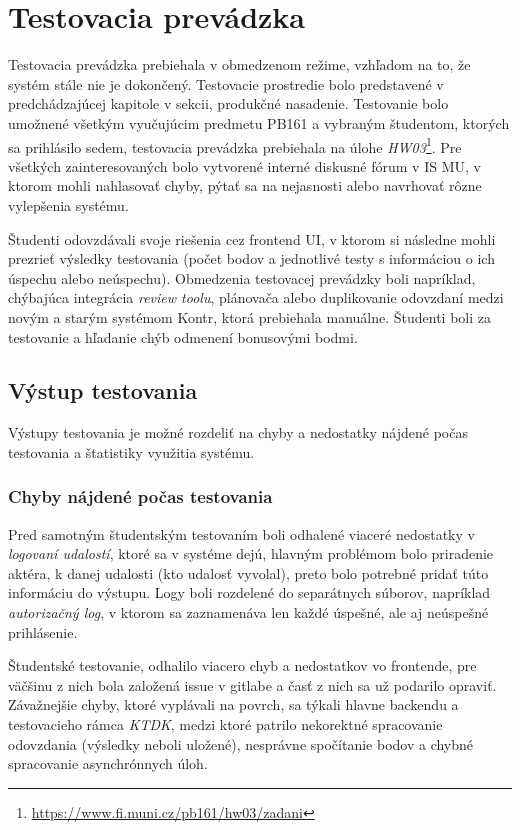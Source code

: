 \documentclass[
  digital, %
  twoside, %
  table,   %
  lof,     %
  lot,     %
]{fithesis3}
\begin{document}
\chapter{Testovacia prevádzka}

Testovacia prevádzka prebiehala v obmedzenom režime, vzhľadom na to, že systém stále nie je dokončený. Testovacie prostredie bolo predstavené v predchádzajúcej kapitole v sekcii, produkčné nasadenie. Testovanie bolo umožnené všetkým vyučujúcim predmetu PB161 a vybraným študentom, ktorých sa prihlásilo sedem, testovacia prevádzka prebiehala na úlohe \emph{HW03}\footnote{\url{https://www.fi.muni.cz/pb161/hw03/zadani}}. Pre všetkých zainteresovaných bolo vytvorené interné diskusné fórum v IS MU, v ktorom mohli nahlasovať chyby, pýtať sa na nejasnosti alebo navrhovať rôzne vylepšenia systému.

Študenti odovzdávali svoje riešenia cez frontend UI, v ktorom si následne mohli prezrieť výsledky testovania (počet bodov a jednotlivé testy s informáciou o ich úspechu alebo neúspechu). Obmedzenia testovacej prevádzky boli napríklad, chýbajúca integrácia \emph{review toolu}, plánovača alebo duplikovanie odovzdaní medzi novým a starým systémom Kontr, ktorá prebiehala manuálne. Študenti boli za testovanie a hľadanie chýb odmenení bonusovými bodmi.

\section{Výstup testovania}
Výstupy testovania je možné rozdeliť na chyby a nedostatky nájdené počas testovania a štatistiky využitia systému.

\subsection{Chyby nájdené počas testovania}

Pred samotným študentským testovaním boli odhalené viaceré nedostatky v \emph{logovaní udalostí}, ktoré sa v systéme dejú, hlavným problémom bolo priradenie aktéra, k danej udalosti (kto udalosť vyvolal), preto bolo potrebné pridať túto informáciu do výstupu. Logy boli rozdelené do separátnych súborov, napríklad \emph{autorizačný log}, v ktorom sa zaznamenáva len každé úspešné, ale aj neúspešné prihlásenie.

Študentské testovanie, odhalilo viacero chyb a nedostatkov vo frontende, pre väčšinu z nich bola založená issue v gitlabe a časť z nich sa už podarilo opraviť.
Závažnejšie chyby, ktoré vyplávali na povrch, sa týkali hlavne backendu a testovacieho rámca \emph{KTDK}, medzi ktoré patrilo nekorektné spracovanie odovzdania (výsledky neboli uložené), nesprávne spočítanie bodov a chybné spracovanie asynchrónnych úloh.
\end{document}
